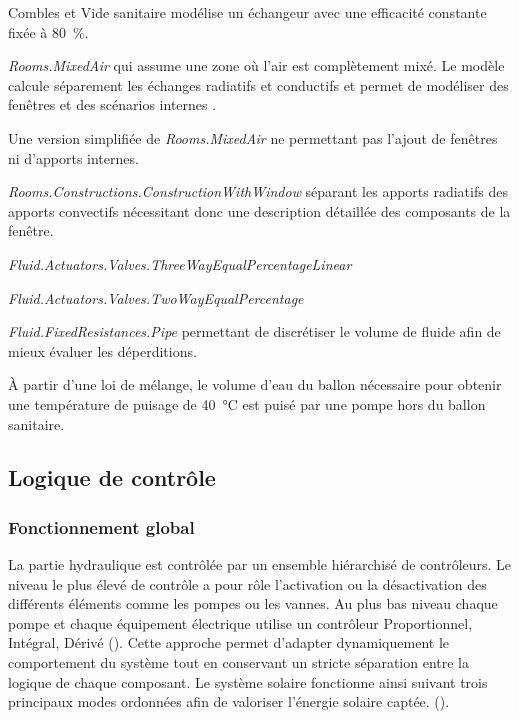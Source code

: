 \begin{blockdescription}{Combles et Vide sanitaire}
          modélise un échangeur avec une efficacité constante fixée à \SI{80}{\percent}.
    \item [Zone chauffée] \textit{Rooms.MixedAir} qui assume une zone où l’air est
          complètement mixé. Le modèle calcule séparement les échanges radiatifs
          et conductifs et permet de modéliser des fenêtres et des scénarios
          internes \parencite{Wetter2011}.
    \item [Combles et Vide sanitaire] Une version simplifiée de \textit{Rooms.MixedAir}
          ne permettant pas l’ajout de fenêtres ni d’apports internes.
    \item [Fenêtres] \textit{Rooms.Constructions.ConstructionWithWindow} séparant
          les apports radiatifs des apports convectifs nécessitant donc une description
          détaillée des composants de la fenêtre.
    \item [Vanne $\bm{3}$ voies] \textit{Fluid.Actuators.Valves.ThreeWayEqualPercentageLinear}
    \item [Vanne $\bm{2}$ voies] \textit{Fluid.Actuators.Valves.TwoWayEqualPercentage}
    \item [Canalisation extérieures] \textit{Fluid.FixedResistances.Pipe} permettant
          de discrétiser le volume de fluide afin de mieux évaluer les déperditions.
    \item [Puisage] À partir d’une loi de mélange, le volume d’eau du ballon nécessaire
          pour obtenir une température de puisage de \SI{40}{\celsius} est puisé
          par une pompe hors du ballon sanitaire.
\end{blockdescription}


\subsection{Logique de contrôle} %
\label{sub:logique_de_controle}
\subsubsection{Fonctionnement global} %
\label{ssub:fonctionnement_global}
La partie hydraulique est contrôlée par un ensemble hiérarchisé de contrôleurs. Le niveau
le plus élevé de contrôle a pour rôle l’activation ou la désactivation des différents
éléments comme les pompes ou les vannes. Au plus bas niveau chaque pompe et chaque
équipement électrique utilise un contrôleur Proportionnel, Intégral, Dérivé (). Cette
approche permet d’adapter dynamiquement le comportement du système tout en conservant un
stricte séparation entre la logique de chaque composant. Le système solaire fonctionne
ainsi suivant trois principaux modes ordonnées afin de valoriser l’énergie solaire captée.
().

